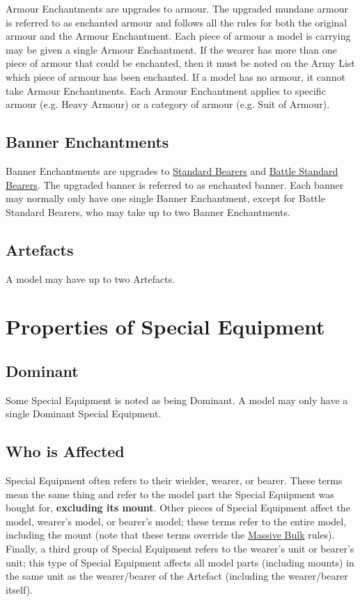 Armour Enchantments are upgrades to armour. The upgraded mundane armour is referred to as enchanted armour and follows all the rules for both the original armour and the Armour Enchantment. Each piece of armour a model is carrying may be given a single Armour Enchantment. If the wearer has more than one piece of armour that could be enchanted, then it must be noted on the Army List which piece of armour has been enchanted. If a model has no armour, it cannot take Armour Enchantments. Each Armour Enchantment applies to specific armour (e.g. Heavy Armour) or a category of armour (e.g. Suit of Armour). 

\subsection{Banner Enchantments}
\label{banner_enchantments}

Banner Enchantments are upgrades to \hyperref[standard_bearer]{Standard Bearers} and \hyperref[bsb]{Battle Standard Bearers}. The upgraded banner is referred to as enchanted banner. Each banner may normally only have one single Banner Enchantment, except for Battle Standard Bearers, who may take up to two Banner Enchantments.

\subsection{Artefacts}
\label{artefacts}

A model may have up to two Artefacts.

\section{Properties of Special Equipment}

\subsection{Dominant}
\label{dominant}

Some Special Equipment is noted as being Dominant. A model may only have a single Dominant Special Equipment.

\subsection{Who is Affected}

Special Equipment often refers to their wielder, wearer, or bearer. These terms mean the same thing and refer to the model part the Special Equipment was bought for, \textbf{excluding its mount}. Other pieces of Special Equipment affect the model, wearer's model, or bearer's model; these terms refer to the entire model, including the mount (note that these terms override the \hyperref[massive_bulk]{Massive Bulk} rules). Finally, a third group of Special Equipment refers to the wearer's unit or bearer's unit; this type of Special Equipment affects all model parts (including mounts) in the same unit as the wearer/bearer of the Artefact (including the wearer/bearer itself).

